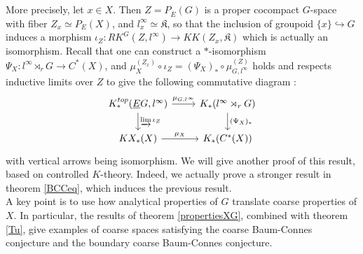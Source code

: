 More precisely, let $x\in X$. Then $Z=P_{\overline E}(G)$ is a proper cocompact $G$-space with fiber $Z_x\simeq P_E(X)$, and $l^\infty_x \simeq \mathfrak K$, so that the inclusion of groupoid $\{x\}\hookrightarrow G $ induces a morphism $\iota_Z : RK^G(Z,l^\infty)\rightarrow KK(Z_x,\mathfrak K)$ which is actually an isomorphism. Recall that one can construct a $*$-isomorphism $\Psi_X: l^\infty \rtimes_r G\rightarrow C^*(X)$, and $\mu_X^{(Z_x)}\circ \iota_Z = (\Psi_X)_*\circ \mu_{G,l^\infty}^{(Z)}$ holds and respects inductive limits over $Z$ to give the following commutative diagram :
\[\begin{tikzcd}
K_*^{top}(\underline E G, l^\infty) \arrow{r}{\mu_{G,l^\infty}}\arrow{d}{\varinjlim \iota_Z} & K_*(l^\infty\rtimes_r G)\arrow{d}{(\Psi_X)_*} \\
KX_*(X)\arrow{r}{\mu_X} & K_*(C^*(X))
\end{tikzcd}\]  
with vertical arrows being isomorphism. We will give another proof of this result, based on controlled $K$-theory. Indeed, we actually prove a stronger result in theorem \ref{BCCeq}, which induces the previous result. \\

A key point is to use how analytical properties of $G$ translate coarse properties of $X$. In particular, the results of theorem \ref{propertiesXG}, combined with theorem \ref{Tu}, give examples of coarse spaces satisfying the coarse Baum-Connes conjecture and the boundary coarse Baum-Connes conjecture.

















